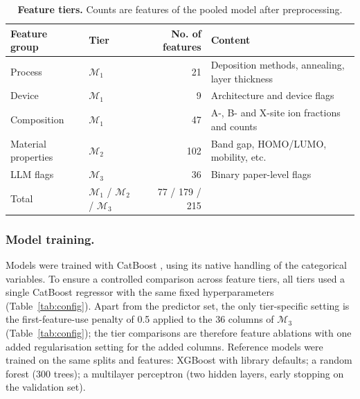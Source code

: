 \documentclass[3p]{elsarticle}
\begin{document}
\begin{table}[htbp]
    \centering\small
    \caption{\textbf{Feature tiers.} Counts are features of the pooled model after preprocessing.}
    \label{tab:tiertable}
    \begin{tabular}{llrp{7cm}}
        \toprule
        Feature group & Tier & No. of features & Content \\
        \midrule
        Process & $\mathcal{M}_1$ & 21 & Deposition methods, annealing, layer thickness \\
        Device & $\mathcal{M}_1$ & 9 & Architecture and device flags \\
        Composition & $\mathcal{M}_1$ & 47 & A-, B- and X-site ion fractions and counts \\
        Material properties & $\mathcal{M}_2$ & 102 & Band gap, HOMO/LUMO, mobility, etc.\\
        LLM flags & $\mathcal{M}_3$ & 36 & Binary paper-level flags \\
        \midrule
        Total & $\mathcal{M}_1$ / $\mathcal{M}_2$ / $\mathcal{M}_3$ & 77 / 179 / 215 & \\
        \bottomrule
    \end{tabular}
\end{table}

\subsubsection{Model training.}
\label{sec:models}
Models were trained with CatBoost \cite{prokhorenkova2018catboost}, using its native handling of the categorical variables. To ensure a controlled comparison across feature tiers, all tiers used a single CatBoost regressor with the same fixed hyperparameters (Table~\ref{tab:config}). Apart from the predictor set, the only tier-specific setting is the first-feature-use penalty of 0.5 applied to the 36 columns of $\mathcal{M}_3$ (Table~\ref{tab:config}); the tier comparisons are therefore feature ablations with one added regularisation setting for the added columns. Reference models were trained on the same splits and features: XGBoost with library defaults; a random forest (300 trees); a multilayer perceptron (two hidden layers, early stopping on the validation set).
\end{document}
